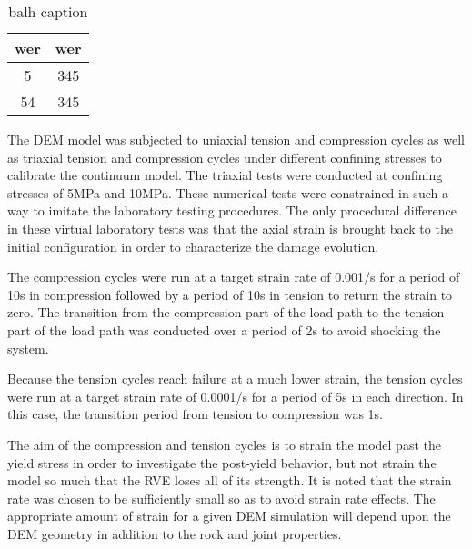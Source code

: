 \begin{table} 
    \begin{tabular}{ c c }
        \hline
        wer & wer \\ 
        \hline
        5 & 345 \\ 
        54 & 345 \\ 
        \hline
    \end{tabular} 
    \caption{balh caption} 
\end{table}
The DEM model was subjected to uniaxial tension and compression cycles as well as triaxial tension and compression cycles under different confining stresses to calibrate the continuum model. The triaxial tests were conducted at confining stresses of 5MPa and 10MPa. These numerical tests were constrained in such a way to imitate the laboratory testing procedures. The only procedural difference in these virtual laboratory tests was that the axial strain is brought back to the initial configuration in order to characterize the damage evolution. 

The compression cycles were run at a target strain rate of 0.001/s for a period of 10s in compression followed by a period of 10s in tension to return the strain to zero. The transition from the compression part of the load path to the tension part of the load path was conducted over a period of 2s to avoid shocking the system.

Because the tension cycles reach failure at a much lower strain, the tension cycles were run at a target strain rate of 0.0001/s for a period of 5s in each direction. In this case, the transition period from tension to compression was  1s.

The aim of the compression and tension cycles is to strain the model past the yield stress in order to investigate the post-yield behavior, but not strain the model so much that the RVE loses all of its strength. It is noted that the strain rate was chosen to be sufficiently small so as to avoid strain rate effects. The appropriate amount of strain for a given DEM simulation will depend upon the DEM geometry in addition to the rock and joint properties. 


